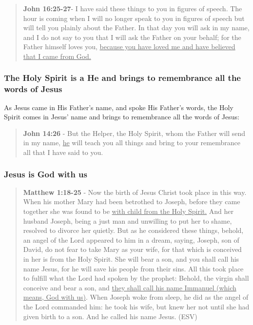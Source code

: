\documentclass[11pt]{article}
\begin{document}
\begin{quote}
\textbf{John 16:25-27}- I have said these things to you in figures of speech. The hour is coming when I will no longer speak to you in figures of speech but will tell you plainly about the Father. In that day you will ask in my name, and I do not say to you that I will ask the Father on your behalf; for the Father himself loves you, \uline{because you have loved me and have believed that I came from God.}
\end{quote}

\subsubsection{The Holy Spirit is a He and brings to remembrance all the words of Jesus}
\label{sec:org3c5a7e4}
As Jesus came in His Father's name, and spoke His Father's words,
the Holy Spirit comes in Jesus' name and brings to remembrance all the words of Jesus:

\begin{quote}
\textbf{John 14:26} - But the Helper, the Holy Spirit, whom the Father will send in my name, \uline{he} will teach you all things and bring to your remembrance all that I have said to you.
\end{quote}

\subsubsection{Jesus is God with us}
\label{sec:orge8993d8}
\begin{quote}
\textbf{Matthew 1:18-25} - Now the birth of Jesus Christ took place in this way. When his mother Mary had been betrothed to Joseph, before they came together she was found to be \uline{with child from the Holy Spirit.} And her husband Joseph, being a just man and unwilling to put her to shame, resolved to divorce her quietly. But as he considered these things, behold, an angel of the Lord appeared to him in a dream, saying, Joseph, son of David, do not fear to take Mary as your wife, for that which is conceived in her is from the Holy Spirit. She will bear a son, and you shall call his name Jesus, for he will save his people from their sins. All this took place to fulfill what the Lord had spoken by the prophet: Behold, the virgin shall conceive and bear a son, and \uline{they shall call his name Immanuel (which means, God with us)}. When Joseph woke from sleep, he did as the angel of the Lord commanded him: he took his wife, but knew her not until she had given birth to a son. And he called his name Jesus. (ESV)
\end{quote}
\end{document}

